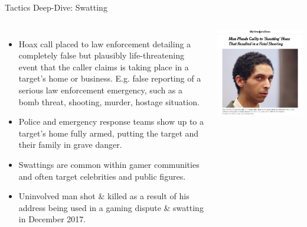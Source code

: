 \documentclass[nobackground,dvipsnames,table,aspectratio=169]{beamer}
\begin{document}
\begin{frame}{Tactics Deep-Dive: Swatting}
    \begin{columns}
            \scriptsize
            \begin{itemize}
                \item Hoax call placed to law enforcement detailing a completely false but plausibly life-threatening event that the caller claims is taking place in a target’s home or business. E.g. false reporting of a serious law enforcement emergency, such as a bomb threat, shooting, murder, hostage situation.
                \item Police and emergency response teams show up to a target’s home fully armed, putting the target and their family in grave danger.
                \item Swattings are common within gamer communities and often target celebrities and public figures.
                \item Uninvolved man shot \& killed as a result of his address being used in a gaming dispute \& swatting in December 2017.
            \end{itemize}
            \includegraphics[width=\textwidth]{swatting-nyt}
    \end{columns}
\end{frame}
\end{document}
